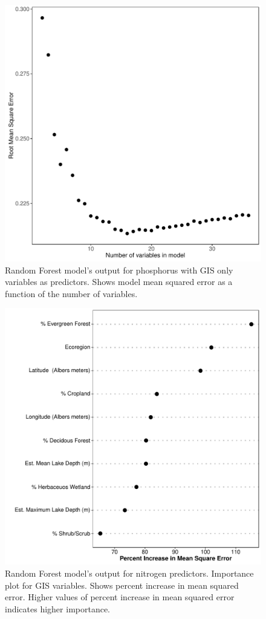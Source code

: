 \documentclass[fleqn,10pt]{wlpeerj} %
\begin{document}
\begin{figure}
  \includegraphics[scale=0.5]{gis_vs_PTL.pdf}
  \caption{Random Forest model's output for phosphorus with GIS only variables as predictors. Shows model mean squared error as a function of the number of variables.}
  \label{fig:gis_vs_PTL}
\end{figure}

\begin{figure}
  \includegraphics[width=\textwidth]{importanceplot_gis_NTL.pdf}
  \caption{Random Forest model's output for nitrogen predictors. Importance plot for GIS variables. Shows percent increase in mean squared error. Higher values of percent increase in mean squared error indicates higher importance.}
  \label{fig:importancePlot_gis_NTL}
\end{figure}
\end{document}
